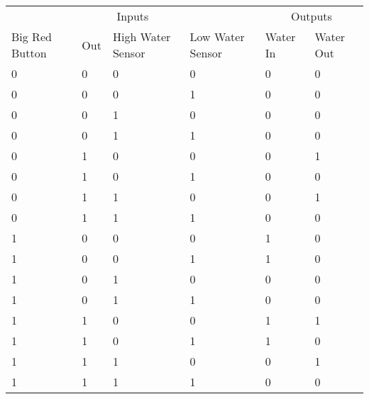 \begin{table}[]
    \begin{tabular}{llll|ll}
    \multicolumn{4}{c|}{Inputs}                                 & \multicolumn{2}{c}{Outputs} \\
    Big Red Button & Out & High Water Sensor & Low Water Sensor & Water In     & Water Out    \\ \hline
    0              & 0   & 0                 & 0                & 0            & 0            \\
    0              & 0   & 0                 & 1                & 0            & 0            \\
    0              & 0   & 1                 & 0                & 0            & 0            \\
    0              & 0   & 1                 & 1                & 0            & 0            \\
    0              & 1   & 0                 & 0                & 0            & 1            \\
    0              & 1   & 0                 & 1                & 0            & 0            \\
    0              & 1   & 1                 & 0                & 0            & 1            \\
    0              & 1   & 1                 & 1                & 0            & 0            \\
    1              & 0   & 0                 & 0                & 1            & 0            \\
    1              & 0   & 0                 & 1                & 1            & 0            \\
    1              & 0   & 1                 & 0                & 0            & 0            \\
    1              & 0   & 1                 & 1                & 0            & 0            \\
    1              & 1   & 0                 & 0                & 1            & 1            \\
    1              & 1   & 0                 & 1                & 1            & 0            \\
    1              & 1   & 1                 & 0                & 0            & 1            \\
    1              & 1   & 1                 & 1                & 0            & 0           
    \end{tabular}
\end{table}